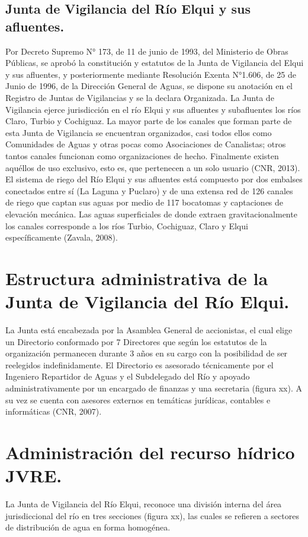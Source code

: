 \documentclass[10pt]{article}
\begin{document}
\subsection{Junta de Vigilancia del Río Elqui y sus afluentes.}
Por Decreto Supremo N° 173, de 11 de junio de 1993, del Ministerio de Obras Públicas, se aprobó la constitución y estatutos de la Junta de Vigilancia del Elqui y sus afluentes, y posteriormente mediante Resolución Exenta N°1.606, de 25 de Junio de 1996, de la Dirección General de Aguas, se dispone su anotación en el Registro de Juntas de Vigilancias y se la declara Organizada. La Junta de Vigilancia ejerce jurisdicción en el río Elqui y sus afluentes y subafluentes los ríos Claro, Turbio y Cochiguaz.
La mayor parte de los canales que forman parte de esta Junta de Vigilancia se encuentran organizados, casi todos ellos como Comunidades de Aguas y otras pocas como Asociaciones de Canalistas; otros tantos canales funcionan como organizaciones de hecho. Finalmente existen aquéllos de uso exclusivo, esto es, que pertenecen a un solo usuario (CNR, 2013).
El sistema de riego del Río Elqui y sus afluentes está compuesto por dos embalses conectados entre sí (La Laguna y Puclaro) y de una extensa red de 126 canales de riego que captan sus aguas por medio de 117 bocatomas y captaciones de elevación mecánica. Las aguas superficiales de donde extraen gravitacionalmente los canales corresponde a los ríos Turbio, Cochiguaz, Claro y Elqui específicamente (Zavala, 2008).

\section{Estructura administrativa de la Junta de Vigilancia del Río Elqui.}
La Junta está encabezada por la Asamblea General de accionistas, el cual elige un Directorio conformado por 7 Directores que según los estatutos de la organización permanecen durante 3 años en su cargo con la posibilidad de ser reelegidos indefinidamente. El Directorio es asesorado técnicamente por el Ingeniero Repartidor de Aguas y el Subdelegado del Río y apoyado administrativamente por un encargado de finanzas y una secretaria (figura xx). A su vez se cuenta con asesores externos en temáticas jurídicas, contables e informáticas (CNR, 2007).

\section{Administración del recurso hídrico JVRE.}%
La Junta de Vigilancia del Río Elqui, reconoce una división interna del área jurisdiccional del río en tres secciones (figura xx), las cuales se refieren a sectores de distribución de agua en forma homogénea.
\end{document}
